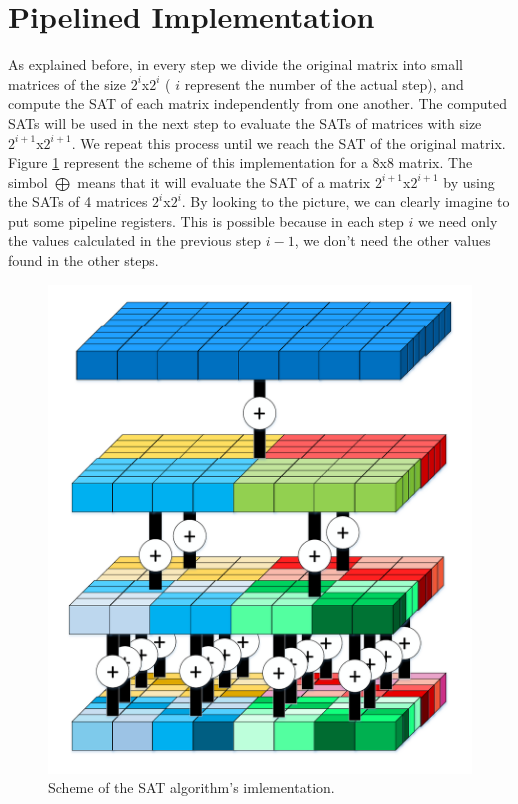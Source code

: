   \section{Pipelined Implementation}
  As explained before, in every step we divide the original matrix into small matrices of the size $ 2^i $x$ 2^i $ ( $ i $ represent the number of the actual step), and compute the SAT of each matrix independently from one another.
  The computed SATs will be used in the next step to evaluate the SATs of matrices with size $ 2^{i+1} $x$ 2^{i+1} $.
  We repeat this process until we reach the SAT of the original matrix. Figure \ref{fig:IIA_overall} represent the scheme of this implementation for a 8x8 matrix.
  The simbol $ \bigoplus $ means that it will evaluate the SAT of a matrix $ 2^{i+1} $x$ 2^{i+1} $ by using the SATs of 4 matrices $ 2^i $x$ 2^i $.
  By looking to the picture, we can clearly imagine to put some pipeline registers. This is possible because in each step $ i $ we need only the values calculated in the previous step $ i-1 $, we don't need the other values found in the other steps.
   
     \begin{figure}[h!]
     	\centering
     	\includegraphics[scale=0.9]{imm/iia/iia_overall}  
     	\caption{Scheme of the SAT algorithm's imlementation.} 
     	\label{fig:IIA_overall}
     \end{figure}
     \clearpage
